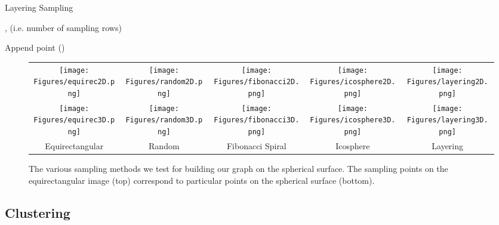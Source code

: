 \documentclass[10pt,twocolumn,letterpaper]{article}
\begin{document}
\begin{algorithm}
\caption{Layering Sampling}
\begin{algorithmic}[1]
\REQUIRE , (i.e. number of sampling rows)
\STATE 
\STATE 
\STATE 
\STATE 
\STATE 

    \STATE 
    \STATE 
    
        \STATE 
        \STATE Append point ()
    \ENDFOR
\ENDFOR
\end{algorithmic}
\end{algorithm}




\begin{figure*}
\begin{center}
\begin{tabular}{ccccc}

\texttt{[image: Figures/equirec2D.png]} &
\texttt{[image: Figures/random2D.png]} &
\texttt{[image: Figures/fibonacci2D.png]} &
\texttt{[image: Figures/icosphere2D.png]} &
\texttt{[image: Figures/layering2D.png]}
\\
\texttt{[image: Figures/equirec3D.png]} &
\texttt{[image: Figures/random3D.png]} &
\texttt{[image: Figures/fibonacci3D.png]} &
\texttt{[image: Figures/icosphere3D.png]} &
\texttt{[image: Figures/layering3D.png]}
\\
Equirectangular &
Random &
Fibonacci Spiral &
Icosphere &
Layering

\end{tabular}
\end{center}
   \caption{ 
        The various sampling methods we test for building our graph on the spherical surface. The sampling points on the equirectangular image (top) correspond to particular points on the spherical surface (bottom).
    }
\label{fig:sampling}
\end{figure*}




\subsection{Clustering}
\end{document}
